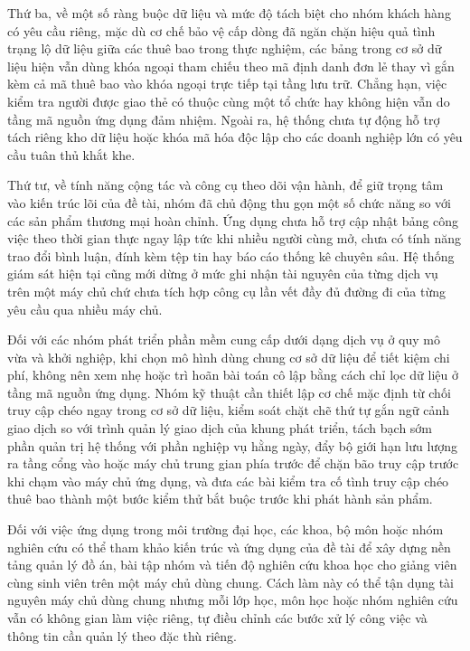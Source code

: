 Thứ ba, về một số ràng buộc dữ liệu và mức độ tách biệt cho nhóm khách hàng có yêu cầu riêng, mặc dù cơ chế bảo vệ cấp dòng đã ngăn chặn hiệu quả tình trạng lộ dữ liệu giữa các thuê bao trong thực nghiệm, các bảng trong cơ sở dữ liệu hiện vẫn dùng khóa ngoại tham chiếu theo mã định danh đơn lẻ thay vì gắn kèm cả mã thuê bao vào khóa ngoại trực tiếp tại tầng lưu trữ. Chẳng hạn, việc kiểm tra người được giao thẻ có thuộc cùng một tổ chức hay không hiện vẫn do tầng mã nguồn ứng dụng đảm nhiệm. Ngoài ra, hệ thống chưa tự động hỗ trợ tách riêng kho dữ liệu hoặc khóa mã hóa độc lập cho các doanh nghiệp lớn có yêu cầu tuân thủ khắt khe.

Thứ tư, về tính năng cộng tác và công cụ theo dõi vận hành, để giữ trọng tâm vào kiến trúc lõi của đề tài, nhóm đã chủ động thu gọn một số chức năng so với các sản phẩm thương mại hoàn chỉnh. Ứng dụng chưa hỗ trợ cập nhật bảng công việc theo thời gian thực ngay lập tức khi nhiều người cùng mở, chưa có tính năng trao đổi bình luận, đính kèm tệp tin hay báo cáo thống kê chuyên sâu. Hệ thống giám sát hiện tại cũng mới dừng ở mức ghi nhận tài nguyên của từng dịch vụ trên một máy chủ chứ chưa tích hợp công cụ lần vết đầy đủ đường đi của từng yêu cầu qua nhiều máy chủ.

\label{v4-conclusion-kiến-nghị}

Đối với các nhóm phát triển phần mềm cung cấp dưới dạng dịch vụ ở quy mô vừa và khởi nghiệp, khi chọn mô hình dùng chung cơ sở dữ liệu để tiết kiệm chi phí, không nên xem nhẹ hoặc trì hoãn bài toán cô lập bằng cách chỉ lọc dữ liệu ở tầng mã nguồn ứng dụng. Nhóm kỹ thuật cần thiết lập cơ chế mặc định từ chối truy cập chéo ngay trong cơ sở dữ liệu, kiểm soát chặt chẽ thứ tự gắn ngữ cảnh giao dịch so với trình quản lý giao dịch của khung phát triển, tách bạch sớm phần quản trị hệ thống với phần nghiệp vụ hằng ngày, đẩy bộ giới hạn lưu lượng ra tầng cổng vào hoặc máy chủ trung gian phía trước để chặn bão truy cập trước khi chạm vào máy chủ ứng dụng, và đưa các bài kiểm tra cố tình truy cập chéo thuê bao thành một bước kiểm thử bắt buộc trước khi phát hành sản phẩm.

Đối với việc ứng dụng trong môi trường đại học, các khoa, bộ môn hoặc nhóm nghiên cứu có thể tham khảo kiến trúc và ứng dụng của đề tài để xây dựng nền tảng quản lý đồ án, bài tập nhóm và tiến độ nghiên cứu khoa học cho giảng viên cùng sinh viên trên một máy chủ dùng chung. Cách làm này có thể tận dụng tài nguyên máy chủ dùng chung nhưng mỗi lớp học, môn học hoặc nhóm nghiên cứu vẫn có không gian làm việc riêng, tự điều chỉnh các bước xử lý công việc và thông tin cần quản lý theo đặc thù riêng.


